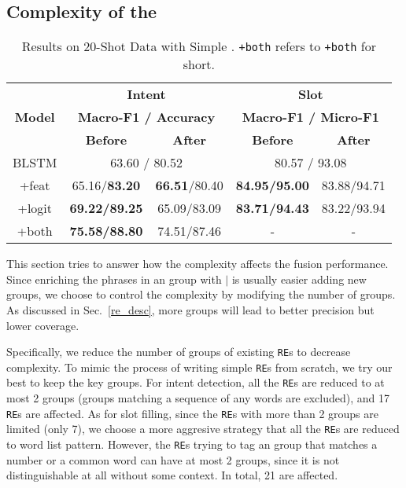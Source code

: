\subsection{Complexity of the \RE}
\label{sec_complexity}
\begin{table}
\setlength{\tabcolsep}{0.23em}
\centering
\small{
\begin{tabular}{|c|c|c|c|c|}

\hline
\multirow{3}{*}{\textbf{Model}}  & \multicolumn{2}{|c|}{\textbf{Intent}} & \multicolumn{2}{|c|}{\textbf{Slot}}  \\
\cline{2-5}
  & \multicolumn{2}{|c|}{\textbf{Macro-F1 / Accuracy}} & \multicolumn{2}{|c|}{\textbf{Macro-F1 / Micro-F1}}  \\
\cline{2-5}
  & \textbf{Before} & \textbf{After} & \textbf{Before} & \textbf{After} \\
\hline
\rowcolor{Gray} BLSTM & \multicolumn{2}{|c|}{63.60 / 80.52} & \multicolumn{2}{|c|}{80.57 / 93.08}  \\
\hline
+feat & 65.16/\textbf{83.20} & \textbf{66.51}/80.40 & \textbf{84.95/95.00} & 83.88/94.71 \\
\hline
\rowcolor{Gray} +logit & \textbf{69.22/89.25} & 65.09/83.09 & \textbf{83.71/94.43} & 83.22/93.94  \\
\hline
+both & \textbf{75.58/88.80} & 74.51/87.46 & - & - \\
\hline
\end{tabular}
}
\caption{Results on 20-Shot Data with Simple \REs. \texttt{+both} refers to \ptatt\texttt{+both} for short.}
\label{tab_simple}
\end{table}

This section tries to answer how the \RE complexity affects the fusion performance.
Since enriching the phrases in an \RE group with $|$ is usually easier adding new groups,
we choose to control the \RE complexity by modifying the number of groups.
As discussed in Sec.~\ref{re_desc}, more \RE groups will lead to better precision but lower coverage.

Specifically, we reduce the number of groups of existing \texttt{RE}s to decrease \RE complexity.
To mimic the process of writing simple \texttt{RE}s from scratch, we try our best to keep the key \RE groups.
For intent detection, all the \texttt{RE}s are reduced to at most 2 groups (groups matching a sequence of any words are excluded), and 17 \texttt{RE}s are affected.
As for slot filling, since the \texttt{RE}s with more than 2 groups are limited (only 7), we choose a more aggresive strategy that all the \texttt{RE}s are reduced to word list pattern.
However, the \texttt{RE}s trying to tag an \RE group that matches a number or a common word can have at most 2 groups, since it is not distinguishable at all without some context.
In total, 21 \REs are affected.

